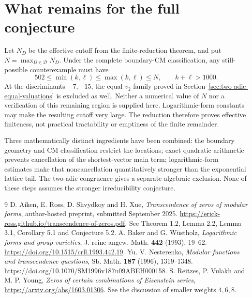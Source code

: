 \documentclass[11pt]{article}
\begin{document}
\section{What remains for the full conjecture}
Let $N_D$ be the effective cutoff from the finite-reduction theorem, and put $N=\max_{D\in\mathcal D}N_D$. Under the complete boundary-CM classification, any still-possible counterexample must have
\[
 502\le\min(k,\ell)\le\max(k,\ell)\le N,
 \qquad k+\ell>1000.
\]
At the discriminants $-7,-15$, the equal-$v_2$ family proved in Section~\ref{sec:two-adic-equal-valuations} is excluded as well. Neither a numerical value of $N$ nor a verification of this remaining region is supplied here. Logarithmic-form constants may make the resulting cutoff very large. The reduction therefore proves effective finiteness, not practical tractability or emptiness of the finite remainder.

Three mathematically distinct ingredients have been combined: the boundary geometry and CM classification restrict the locations; exact quadratic arithmetic prevents cancellation of the shortest-vector main term; logarithmic-form estimates make that noncancellation quantitatively stronger than the exponential lattice tail. The two-adic congruence gives a separate algebraic exclusion. None of these steps assumes the stronger irreducibility conjecture.

\begin{thebibliography}{9}
 D. Aiken, E. Ross, D. Shvydkoy and H. Xue,
\emph{Transcendence of zeros of modular forms}, author-hosted preprint, submitted September 2025.
\url{https://erick-ross.github.io/transcendence-of-zeros.pdf}.
See Theorem 1.2, Lemma 2.2, Lemma 3.1, Corollary 5.1 and Conjecture 5.2.
 A. Baker and G. W\"ustholz,
\emph{Logarithmic forms and group varieties}, J. reine angew. Math. \textbf{442} (1993), 19--62.
\url{https://doi.org/10.1515/crll.1993.442.19}.
 Yu. V. Nesterenko,
\emph{Modular functions and transcendence questions}, Sb. Math. \textbf{187} (1996), 1319--1348.
\url{https://doi.org/10.1070/SM1996v187n09ABEH000158}.
 S. Reitzes, P. Vulakh and M. P. Young,
\emph{Zeros of certain combinations of Eisenstein series},
\url{https://arxiv.org/abs/1603.01306}.
See the discussion of smaller weights $4,6,8$.
\end{thebibliography}
\end{document}
